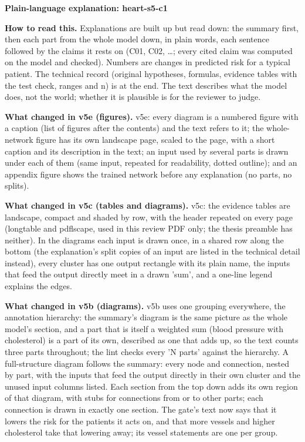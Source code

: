 \documentclass[a4paper,10pt]{article}
\begin{document}
\begin{center}{\Large\bfseries Plain-language explanation: heart-s5-c1\par}\vspace{2mm}{\small AI-assisted drafts for review. Nothing here has been verified by a person.\par}\end{center}
\noindent\textbf{How to read this.} Explanations are built up but read down: the summary first, then each part from the whole model down, in plain words, each sentence followed by the claims it rests on (C01, C02, \ldots; every cited claim was computed on the model and checked). Numbers are changes in predicted risk for a typical patient. The technical record (original hypotheses, formulas, evidence tables with the test check, ranges and n) is at the end. The text describes what the model does, not the world; whether it is plausible is for the reviewer to judge.
\par\medskip\noindent\textbf{What changed in v5e (figures).} v5e: every diagram is a numbered figure with a caption (list of figures after the contents) and the text refers to it; the whole-network figure has its own landscape page, scaled to the page, with a short caption and its description in the text; an input used by several parts is drawn under each of them (same input, repeated for readability, dotted outline); and an appendix figure shows the trained network before any explanation (no parts, no splits).
\par\medskip\noindent\textbf{What changed in v5c (tables and diagrams).} v5c: the evidence tables are landscape, compact and shaded by row, with the header repeated on every page (longtable and pdflscape, used in this review PDF only; the thesis preamble has neither). In the diagrams each input is drawn once, in a shared row along the bottom (the explanation's split copies of an input are listed in the technical detail instead), every cluster has one output rectangle with its plain name, the inputs that feed the output directly meet in a drawn 'sum', and a one-line legend explains the edges.
\par\medskip\noindent\textbf{What changed in v5b (diagrams).} v5b uses one grouping everywhere, the annotation hierarchy: the summary's diagram is the same picture as the whole model's section, and a part that is itself a weighted sum (blood pressure with cholesterol) is a part of its own, described as one that adds up, so the text counts three parts throughout; the lint checks every 'N parts' against the hierarchy. A full-structure diagram follows the summary: every node and connection, nested by part, with the inputs that feed the output directly in their own cluster and the unused input columns listed. Each section from the top down adds its own region of that diagram, with stubs for connections from or to other parts; each connection is drawn in exactly one section. The gate's text now says that it lowers the risk for the patients it acts on, and that more vessels and higher cholesterol take that lowering away; its vessel statements are one per group.
\end{document}
